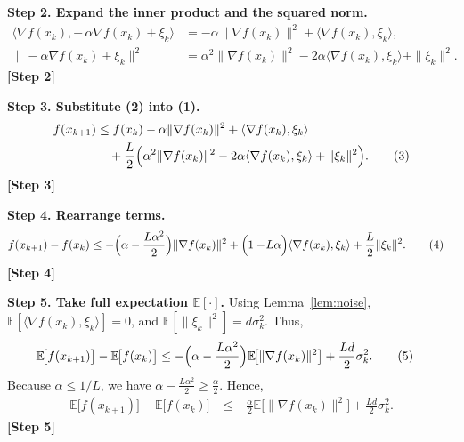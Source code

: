 \documentclass{article}
\newcommand{\E}{\mathbb{E}}
\begin{document}
\noindent\textbf{Step 2. Expand the inner product and the squared norm.}
\begin{align}
\big\langle\nabla f(x_{k}),-\,\alpha\nabla f(x_{k})+\xi_{k}\big\rangle
   &=-\alpha\|\nabla f(x_{k})\|^{2}+\langle\nabla f(x_{k}),\xi_{k}\rangle,\\[4pt]
\big\|-\alpha\nabla f(x_{k})+\xi_{k}\big\|^{2}
   &=\alpha^{2}\|\nabla f(x_{k})\|^{2}
     -2\alpha\langle\nabla f(x_{k}),\xi_{k}\rangle
     +\|\xi_{k}\|^{2}. \tag{2}
\end{align}
\noindent\textbf{[Step 2]}

\noindent\textbf{Step 3. Substitute (2) into (1).}
\begin{align}
f(x_{k+1})
 &\le f(x_{k})
   -\alpha\|\nabla f(x_{k})\|^{2}
   +\langle\nabla f(x_{k}),\xi_{k}\rangle  \nonumber\\
 &\quad +\frac{L}{2}\Bigl(\alpha^{2}\|\nabla f(x_{k})\|^{2}
      -2\alpha\langle\nabla f(x_{k}),\xi_{k}\rangle
      +\|\xi_{k}\|^{2}\Bigr). \tag{3}
\end{align}
\noindent\textbf{[Step 3]}

\noindent\textbf{Step 4. Rearrange terms.}
\begin{align}
f(x_{k+1})-f(x_{k})
 &\le -\Bigl(\alpha-\frac{L\alpha^{2}}{2}\Bigr)\|\nabla f(x_{k})\|^{2}
   +\Bigl(1-\!L\alpha\Bigr)\langle\nabla f(x_{k}),\xi_{k}\rangle
   +\frac{L}{2}\|\xi_{k}\|^{2}. \tag{4}
\end{align}
\noindent\textbf{[Step 4]}

\noindent\textbf{Step 5. Take full expectation $\E[\cdot]$.}  
Using Lemma~\ref{lem:noise}, $\E[\langle\nabla f(x_{k}),\xi_{k}\rangle]=0$, and $\E[\|\xi_{k}\|^{2}]=d\sigma_{k}^{2}$. Thus,
\begin{align}
\E\!\bigl[f(x_{k+1})\bigr]-\E\!\bigl[f(x_{k})\bigr]
 &\le -\Bigl(\alpha-\frac{L\alpha^{2}}{2}\Bigr)\E\!\bigl[\|\nabla f(x_{k})\|^{2}\bigr]
   +\frac{L d}{2}\sigma_{k}^{2}. \tag{5}
\end{align}
Because $\alpha\le 1/L$, we have $ \alpha-\frac{L\alpha^{2}}{2}\ge \frac{\alpha}{2}$. Hence,
\begin{align}
\E\!\bigl[f(x_{k+1})\bigr]-\E\!\bigl[f(x_{k})\bigr]
 &\le -\frac{\alpha}{2}\E\!\bigl[\|\nabla f(x_{k})\|^{2}\bigr]
   +\frac{L d}{2}\sigma_{k}^{2}. \tag{6}
\end{align}
\noindent\textbf{[Step 5]}
\end{document}
